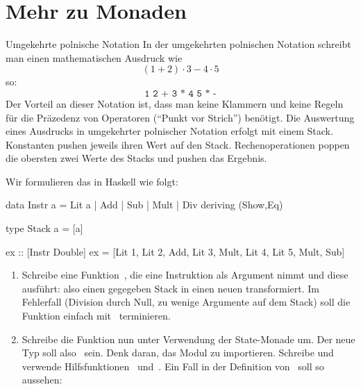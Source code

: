 \documentclass{uebblatt}
\begin{document}

\section{Mehr zu Monaden}

\begin{aufgabe}{Umgekehrte polnische Notation}
In der umgekehrten polnischen Notation schreibt man einen mathematischen
Ausdruck wie
\[ (1 + 2) \cdot 3 - 4 \cdot 5 \]
so:
\[ \texttt{1 2 + 3 * 4 5 * -} \]
Der Vorteil an dieser Notation ist, dass man keine Klammern und keine Regeln
für die Präzedenz von Operatoren ("`Punkt vor Strich"') benötigt. Die
Auswertung eines Ausdrucks in umgekehrter polnischer Notation erfolgt mit
einem Stack. Konstanten pushen jeweils ihren Wert auf den Stack.
Rechenoperationen poppen die obersten zwei Werte des Stacks und pushen das
Ergebnis.

Wir formulieren das in Haskell wie folgt:

\begin{haskellcode}
data Instr a
    = Lit a
    | Add
    | Sub
    | Mult
    | Div
    deriving (Show,Eq)

type Stack a = [a]

ex :: [Instr Double]
ex = [Lit 1, Lit 2, Add, Lit 3, Mult, Lit 4, Lit 5, Mult, Sub]
\end{haskellcode}

\begin{enumerate}
\item Schreibe eine Funktion~, die eine Instruktion als Argument nimmt und diese ausführt: also einen
gegegeben Stack in einen neuen transformiert. Im Fehlerfall (Division durch
Null, zu wenige Argumente auf dem Stack) soll die Funktion einfach
mit~ terminieren.
\item Schreibe die Funktion nun unter Verwendung der State-Monade um. Der neue
Typ soll also~
sein. Denk daran, das Modul  zu importieren.
Schreibe und verwende Hilfsfunktionen~ und~. Ein Fall in der Definition
von~ soll so aussehen:


\end{enumerate}
\end{aufgabe}
\end{document}
